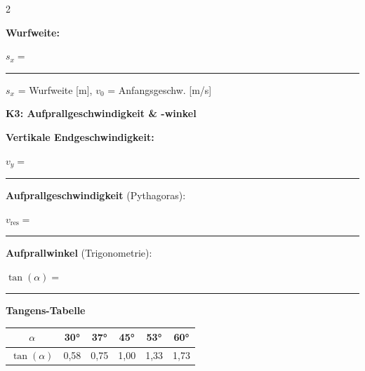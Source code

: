 \documentclass[10pt, a4paper]{article}
\newcommand{\fachfarbe}{physik}
\newcommand{\luecke}[1]{\rule{#1}{0.4pt}}
\newcommand{\abschnitt}[1]{%
    \vspace{4pt}
    \noindent\textbf{\textcolor{\fachfarbe}{#1}}
    \vspace{2pt}
}
\begin{document}
\begin{multicols}{2}
\vspace{3pt}

\begin{formelbox}
\textbf{Wurfweite:}
\vspace{4pt}

$s_x = $ \luecke{4cm}

\vspace{2pt}
\footnotesize
$s_x$ = Wurfweite [m], $v_0$ = Anfangsgeschw. [m/s]
\end{formelbox}

\vspace{2pt}


\abschnitt{K3: Aufprallgeschwindigkeit \& -winkel}

\begin{formelbox}
\textbf{Vertikale Endgeschwindigkeit:}
\vspace{4pt}

$v_y = $ \luecke{4cm}

\vspace{6pt}
\textbf{Aufprallgeschwindigkeit} (Pythagoras):
\vspace{4pt}

$v_{\text{res}} = $ \luecke{4cm}

\vspace{6pt}
\textbf{Aufprallwinkel} (Trigonometrie):
\vspace{4pt}

$\tan(\alpha) = $ \luecke{4cm}
\end{formelbox}

\vspace{2pt}


\abschnitt{Tangens-Tabelle}

\begin{center}
\begin{tabular}{|c|c|c|c|c|c|}
\hline
$\alpha$ & 30° & 37° & 45° & 53° & 60° \\
\hline
$\tan(\alpha)$ & 0,58 & 0,75 & 1,00 & 1,33 & 1,73 \\
\hline
\end{tabular}
\end{center}



\end{multicols}
\end{document}
